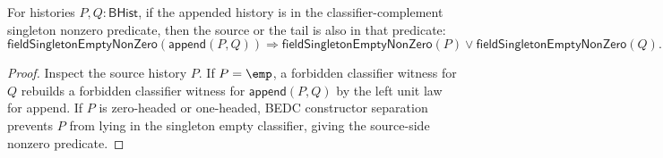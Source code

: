 \begin{theorem}
\label{thm:field-singleton-empty-nonzero-append-source-or-tail}
For histories $P,Q:\mathsf{BHist}$, if the appended history is in the
classifier-complement singleton nonzero predicate, then the source or the tail
is also in that predicate:
$$
\mathsf{fieldSingletonEmptyNonZero}(\mathsf{append}(P,Q))
\Rightarrow
\mathsf{fieldSingletonEmptyNonZero}(P)\vee
\mathsf{fieldSingletonEmptyNonZero}(Q).
$$
\end{theorem}
\begin{proof}
Inspect the source history $P$. If $P=\emp$, a forbidden classifier witness for
$Q$ rebuilds a forbidden classifier witness for $\mathsf{append}(P,Q)$ by the
left unit law for append. If $P$ is zero-headed or one-headed, BEDC constructor
separation prevents $P$ from lying in the singleton empty classifier, giving
the source-side nonzero predicate.
\end{proof}
